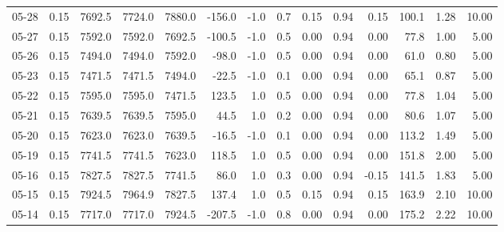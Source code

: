\begin{threeparttable}
{\begin{tabular}{lrrrrrrrrrrrrr}
  05-28 &     0.15 & 7692.5 & 7724.0 & 7880.0 &     -156.0 &                     -1.0 &                 0.7 &       0.15 &      0.94 &           0.15 &            100.1 &            1.28 &                  10.00 \\
  05-27 &     0.15 & 7592.0 & 7592.0 & 7692.5 &     -100.5 &                     -1.0 &                 0.5 &       0.00 &      0.94 &           0.00 &             77.8 &            1.00 &                   5.00 \\
  05-26 &     0.15 & 7494.0 & 7494.0 & 7592.0 &      -98.0 &                     -1.0 &                 0.5 &       0.00 &      0.94 &           0.00 &             61.0 &            0.80 &                   5.00 \\
  05-23 &     0.15 & 7471.5 & 7471.5 & 7494.0 &      -22.5 &                     -1.0 &                 0.1 &       0.00 &      0.94 &           0.00 &             65.1 &            0.87 &                   5.00 \\
  05-22 &     0.15 & 7595.0 & 7595.0 & 7471.5 &      123.5 &                      1.0 &                 0.5 &       0.00 &      0.94 &           0.00 &             77.8 &            1.04 &                   5.00 \\
  05-21 &     0.15 & 7639.5 & 7639.5 & 7595.0 &       44.5 &                      1.0 &                 0.2 &       0.00 &      0.94 &           0.00 &             80.6 &            1.07 &                   5.00 \\
  05-20 &     0.15 & 7623.0 & 7623.0 & 7639.5 &      -16.5 &                     -1.0 &                 0.1 &       0.00 &      0.94 &           0.00 &            113.2 &            1.49 &                   5.00 \\
  05-19 &     0.15 & 7741.5 & 7741.5 & 7623.0 &      118.5 &                      1.0 &                 0.5 &       0.00 &      0.94 &           0.00 &            151.8 &            2.00 &                   5.00 \\
  05-16 &     0.15 & 7827.5 & 7827.5 & 7741.5 &       86.0 &                      1.0 &                 0.3 &       0.00 &      0.94 &          -0.15 &            141.5 &            1.83 &                   5.00 \\
  05-15 &     0.15 & 7924.5 & 7964.9 & 7827.5 &      137.4 &                      1.0 &                 0.5 &       0.15 &      0.94 &           0.15 &            163.9 &            2.10 &                  10.00 \\
  05-14 &     0.15 & 7717.0 & 7717.0 & 7924.5 &     -207.5 &                     -1.0 &                 0.8 &       0.00 &      0.94 &           0.00 &            175.2 &            2.22 &                  10.00 \\

\end{tabular}}
\end{threeparttable}
